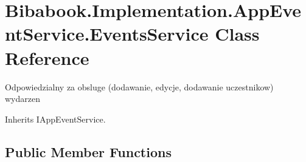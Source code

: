\hypertarget{class_bibabook_1_1_implementation_1_1_app_event_service_1_1_events_service}{}\section{Bibabook.\+Implementation.\+App\+Event\+Service.\+Events\+Service Class Reference}
\label{class_bibabook_1_1_implementation_1_1_app_event_service_1_1_events_service}


Odpowiedzialny za obsluge (dodawanie, edycje, dodawanie uczestnikow) wydarzen  




Inherits I\+App\+Event\+Service.

\subsection*{Public Member Functions}
